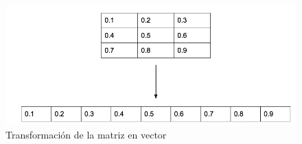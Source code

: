 \documentclass{sig-alternate}
\begin{document}




\onecolumn
\begin{figure}[ht]
		\includegraphics[scale=0.5]{./figures/matrix_to_array.png}
  		\caption{Transformación de la matriz en vector}
  		\label{fig:indiv}
	\end{figure}
\end{document}
